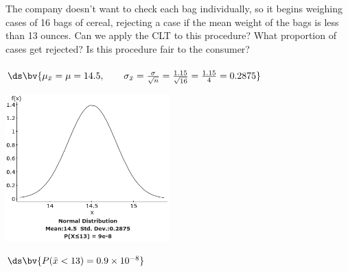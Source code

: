 \documentclass{article}
\begin{document}
\begin{flushleft}
\begin{enumalpha}
\item The company doesn't want to check each bag individually, so it begins weighing cases of 16 bags of cereal, rejecting a case if the mean weight of the bags is less than 13 ounces. Can we apply the CLT to this procedure? What proportion of cases get rejected? Is this procedure fair to the consumer?\\
\medskip
{}\\
\medskip
$\ds\bv{\mu_{\bar x} = \mu = 14.5, \qquad \sigma_{\bar x} = \frac{\sigma}{\sqrt n} = \frac {1.15}{\sqrt{16}} = \frac {1.15}4 = 0.2875}$\\
\smallskip
{\centering
\includegraphics[width=2.5in]{images/grp06_Q2_b}
\par}
$\ds\bv{P(\bar x < 13) = 0.9 \times 10^{-8}}$\\
\medskip
{}

\end{enumalpha}

\newpage
\newpage

\end{flushleft}
\end{document}
